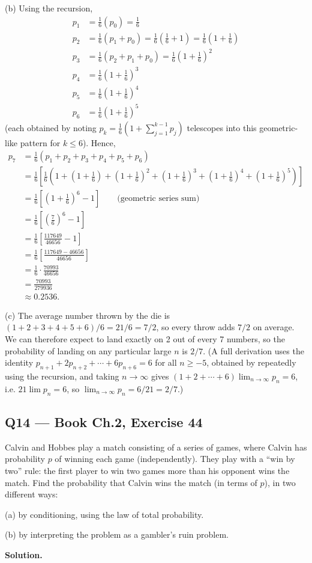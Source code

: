 \documentclass[11pt]{article}
\begin{document}
(b) Using the recursion,
\begin{align*}
p_1 &= \frac16(p_0) = \frac16 \\
p_2 &= \frac16(p_1+p_0) = \frac16\left(\frac16+1\right) = \frac16\left(1+\frac16\right) \\
p_3 &= \frac16(p_2+p_1+p_0) = \frac16\left(1+\frac16\right)^2 \\
p_4 &= \frac16\left(1+\frac16\right)^3 \\
p_5 &= \frac16\left(1+\frac16\right)^4 \\
p_6 &= \frac16\left(1+\frac16\right)^5
\end{align*}
(each obtained by noting $p_{k} = \tfrac16\!\left(1+\sum_{j=1}^{k-1}p_j\right)$ telescopes into this geometric-like pattern for $k \le 6$).
Hence,
\begin{align*}
p_7 &= \frac16(p_1+p_2+p_3+p_4+p_5+p_6) \\
&= \frac16\left[\frac16\left(1+\left(1+\tfrac16\right)+\left(1+\tfrac16\right)^2+\left(1+\tfrac16\right)^3+\left(1+\tfrac16\right)^4+\left(1+\tfrac16\right)^5\right)\right] \\
&= \frac16\left[\left(1+\frac16\right)^6 - 1\right] \qquad \text{(geometric series sum)} \\
&= \frac16\left[\left(\frac76\right)^6 - 1\right] \\
&= \frac16\left[\frac{117649}{46656} - 1\right] \\
&= \frac16\left[\frac{117649 - 46656}{46656}\right] \\
&= \frac16\cdot\frac{70993}{46656} \\
&= \frac{70993}{279936} \\
&\approx 0.2536.
\end{align*}

(c) The average number thrown by the die is $(1+2+3+4+5+6)/6 = 21/6 = 7/2$, so every throw adds $7/2$ on average. We can therefore expect to land exactly on 2 out of every 7 numbers, so the probability of landing on any particular large $n$ is $2/7$. (A full derivation uses the identity $p_{n+1}+2p_{n+2}+\cdots+6p_{n+6}=6$ for all $n\ge -5$, obtained by repeatedly using the recursion, and taking $n\to\infty$ gives $(1+2+\cdots+6)\lim_{n\to\infty}p_n = 6$, i.e. $21\lim p_n = 6$, so $\lim_{n\to\infty}p_n = 6/21 = 2/7$.)

\subsection*{Q14 --- Book Ch.2, Exercise 44}
\begin{qbox}
Calvin and Hobbes play a match consisting of a series of games, where Calvin has probability $p$ of winning each game (independently). They play with a ``win by two'' rule: the first player to win two games more than his opponent wins the match. Find the probability that Calvin wins the match (in terms of $p$), in two different ways:

(a) by conditioning, using the law of total probability.

(b) by interpreting the problem as a gambler's ruin problem.
\end{qbox}
\textbf{Solution.}
\end{document}
